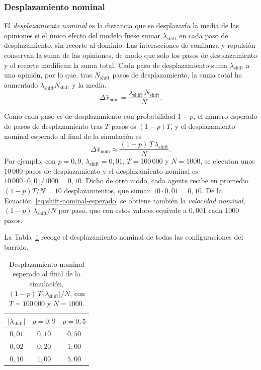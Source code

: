\documentclass[11pt,a4paper]{article}
\begin{document}
\subsubsection{Desplazamiento nominal}
\label{sec:shift-nominal}

El \emph{desplazamiento nominal} es la distancia que se desplazaría la media de las opiniones si el único efecto del modelo fuese sumar $\lambda_{\mathrm{shift}}$ en cada paso de desplazamiento, sin recorte al dominio. Las interacciones de confianza y repulsión conservan la suma de las opiniones, de modo que solo los pasos de desplazamiento y el recorte modifican la suma total. Cada paso de desplazamiento suma $\lambda_{\mathrm{shift}}$ a una opinión, por lo que, tras $N_{\mathrm{shift}}$ pasos de desplazamiento, la suma total ha aumentado $\lambda_{\mathrm{shift}}N_{\mathrm{shift}}$ y la media.
\begin{equation}
\label{eq:shift-nominal-def}
\Delta\bar{x}_{\mathrm{nom}}=\frac{\lambda_{\mathrm{shift}}\,N_{\mathrm{shift}}}{N}.
\end{equation}

Como cada paso es de desplazamiento con probabilidad $1-p$, el número esperado de pasos de desplazamiento tras $T$ pasos es $(1-p)T$, y el desplazamiento nominal esperado al final de la simulación es
\begin{equation}
\label{eq:shift-nominal-esperado}
\Delta\bar{x}_{\mathrm{nom}}\approx\frac{(1-p)\,T\,\lambda_{\mathrm{shift}}}{N}.
\end{equation}
Por ejemplo, con $p=0{,}9$, $\lambda_{\mathrm{shift}}=0{,}01$, $T=100\,000$ y $N=1000$, se ejecutan unos $10\,000$ pasos de desplazamiento y el desplazamiento nominal es $10\,000\cdot0{,}01/1000=0{,}10$. Dicho de otro modo, cada agente recibe en promedio $(1-p)T/N=10$ desplazamientos, que suman $10\cdot0{,}01=0{,}10$. De la Ecuación~\eqref{eq:shift-nominal-esperado} se obtiene también la \emph{velocidad nominal}, $(1-p)\,\lambda_{\mathrm{shift}}/N$ por paso, que con estos valores equivale a $0{,}001$ cada $1000$ pasos.

La Tabla~\ref{tab:shift-nominal-valores} recoge el desplazamiento nominal de todas las configuraciones del barrido.
\begin{table}[htbp]
\centering
\caption{Desplazamiento nominal esperado al final de la simulación, $(1-p)\,T\,|\lambda_{\mathrm{shift}}|/N$, con $T=100\,000$ y $N=1000$.}
\label{tab:shift-nominal-valores}
\begin{tabular}{ccc}
\toprule
$|\lambda_{\mathrm{shift}}|$ & $p=0{,}9$ & $p=0{,}5$ \\
\midrule
$0{,}01$ & $0{,}10$ & $0{,}50$ \\
$0{,}02$ & $0{,}20$ & $1{,}00$ \\
$0{,}10$ & $1{,}00$ & $5{,}00$ \\
\bottomrule
\end{tabular}
\end{table}
\end{document}
